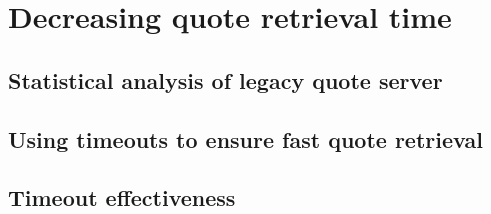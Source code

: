 \section{Decreasing quote retrieval time}

\subsection{Statistical analysis of legacy quote server}

\subsection{Using timeouts to ensure fast quote retrieval}

\subsection{Timeout effectiveness}
